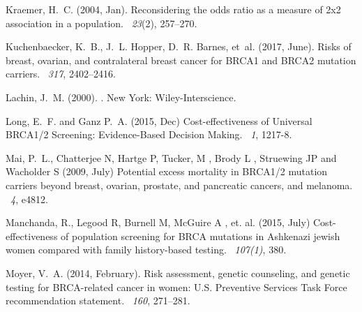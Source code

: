 \documentclass[11pt, letterpaper]{article}
\begin{document}
\begin{thebibliography}{}
	Kraemer, H.~C. (2004, Jan).
	\newblock Reconsidering the odds ratio as a measure of 2x2 association in a
	population.
	~{\em 23\/}(2), 257--270.
	
	Kuchenbaecker, K.~B., J.~L. Hopper, D.~R. Barnes, et~al. (2017, June).
	\newblock Risks of breast, ovarian, and contralateral breast cancer for {BRCA1}
	and {BRCA2} mutation carriers.
	~{\em 317}, 2402--2416.
	
	Lachin, J.~M. (2000).
	.
	\newblock New York: Wiley-Interscience.
	
	Long, E.~F. and Ganz P.~A. (2015, Dec)
	\newblock Cost-effectiveness of Universal BRCA1/2 Screening: Evidence-Based Decision Making.
	~{\em 1}, 1217-8.
	
	Mai, P.~L., Chatterjee N, Hartge P, Tucker, M , Brody L , Struewing JP and Wacholder S (2009, July)
	\newblock Potential excess mortality in {BRCA1/2} mutation carriers beyond breast, ovarian, prostate, and pancreatic cancers, and melanoma.
	~{\em 4}, e4812.

	Manchanda, R., Legood R, Burnell M, McGuire A , et. al.  (2015, July)
	\newblock Cost-effectiveness of population screening for {BRCA} mutations in {A}shkenazi jewish women compared with family history-based testing.
	~{\em 107(1)}, 380.


	Moyer, V.~A. (2014, February).
	\newblock Risk assessment, genetic counseling, and genetic testing for
	{BRCA}-related cancer in women: {U.S.} {P}reventive {S}ervices {T}ask {F}orce
	recommendation statement.
	~{\em 160}, 271--281.
	

\end{thebibliography}
\end{document}
